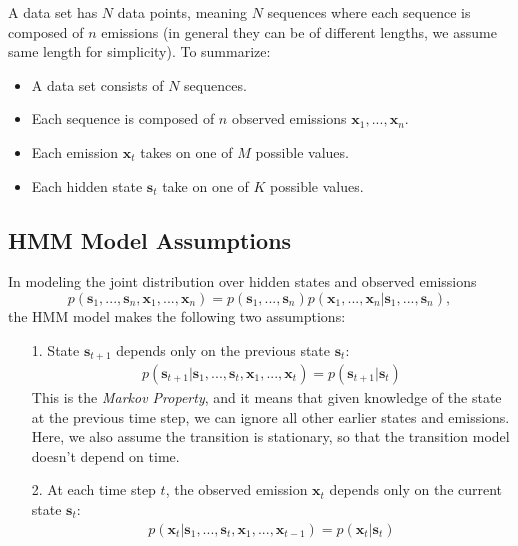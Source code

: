A data set has $N$ data points, meaning $N$ sequences where each sequence is composed of $n$ emissions (in general they can be of different lengths, we assume same length for simplicity).
To summarize:
%
\begin{itemize}
	\item A data set consists of $N$ sequences.
	\item Each sequence is composed of $n$ observed emissions $\textbf{x}_1, ..., \textbf{x}_n$.
	\item Each emission $\textbf{x}_{t}$ takes on one of $M$ possible values.
	\item Each hidden state $\textbf{s}_{t}$ take on one of $K$ possible values.
\end{itemize}

\subsection{HMM Model Assumptions}


In modeling the joint distribution over hidden states and observed emissions
\begin{equation} \label{large-joint}
	p(\textbf{s}_1, ..., \textbf{s}_n, \textbf{x}_1, ..., \textbf{x}_n) = p(\textbf{s}_1, ..., \textbf{s}_n) p(\textbf{x}_1, ..., \textbf{x}_n | \textbf{s}_1, ..., \textbf{s}_n),
\end{equation}
%
the HMM model makes the following two assumptions:
%
\begin{itemize}
    \item[1.] State $\textbf{s}_{t+1}$ depends only on the previous state $\textbf{s}_t$:
	    \begin{align*}
	    	p(\textbf{s}_{t+1} | \textbf{s}_{1}, ..., \textbf{s}_{t}, \textbf{x}_{1}, ..., \textbf{x}_{t}) = p(\textbf{s}_{t+1} | \textbf{s}_{t}) 
	    \end{align*}
            This is the \textit{Markov Property}, and it means that given knowledge of the state at the previous time step, we can ignore all other earlier states and emissions. Here, we also assume the transition is stationary, so that the transition model doesn't depend on time.
          \item[2.] At each time step $t$, the observed emission $\textbf{x}_t$ depends only on the current state $\textbf{s}_t$:
    	\begin{align*}
	    	p(\textbf{x}_{t} | \textbf{s}_{1}, ..., \textbf{s}_{t}, \textbf{x}_{1}, ..., \textbf{x}_{t-1}) = p(\textbf{x}_{t} | \textbf{s}_{t}) 
	    \end{align*}
          \end{itemize}
          
